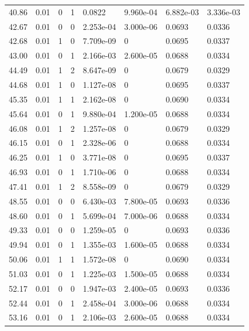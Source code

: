 \documentclass[preview]{standalone}
\begin{document}
{{{\begin{tabular}{L{1.2cm}C{1.2cm} C{0.3cm}C{0.5cm} C{1.4cm}C{1.4cm} C{1.4cm}C{1.4cm}}
  40.86  &  0.01  & 0     &  1 &  0.0822  & 9.960e-04  & 6.882e-03 &  3.336e-03   \\ 
  42.67  &  0.01  & 0     &  0 &  2.253e-04  & 3.000e-06  & 0.0693 &  0.0336   \\ 
  42.68  &  0.01  & 1     &  0 &  7.709e-09  & 0  & 0.0695 &  0.0337   \\ 
  43.00  &  0.01  & 0     &  1 &  2.166e-03  & 2.600e-05  & 0.0688 &  0.0334   \\ 
  44.49  &  0.01  & 1     &  2 &  8.647e-09  & 0  & 0.0679 &  0.0329   \\ 
  44.68  &  0.01  & 1     &  0 &  1.127e-08  & 0  & 0.0695 &  0.0337   \\ 
  45.35  &  0.01  & 1     &  1 &  2.162e-08  & 0  & 0.0690 &  0.0334   \\ 
  45.64  &  0.01  & 0     &  1 &  9.880e-04  & 1.200e-05  & 0.0688 &  0.0334   \\ 
  46.08  &  0.01  & 1     &  2 &  1.257e-08  & 0  & 0.0679 &  0.0329   \\ 
  46.15  &  0.01  & 0     &  1 &  2.328e-06  & 0  & 0.0688 &  0.0334   \\ 
  46.25  &  0.01  & 1     &  0 &  3.771e-08  & 0  & 0.0695 &  0.0337   \\ 
  46.93  &  0.01  & 0     &  1 &  1.710e-06  & 0  & 0.0688 &  0.0334   \\ 
  47.41  &  0.01  & 1     &  2 &  8.558e-09  & 0  & 0.0679 &  0.0329   \\ 
  48.55  &  0.01  & 0     &  0 &  6.430e-03  & 7.800e-05  & 0.0693 &  0.0336   \\ 
  48.60  &  0.01  & 0     &  1 &  5.699e-04  & 7.000e-06  & 0.0688 &  0.0334   \\ 
  49.33  &  0.01  & 0     &  0 &  1.259e-05  & 0  & 0.0693 &  0.0336   \\ 
  49.94  &  0.01  & 0     &  1 &  1.355e-03  & 1.600e-05  & 0.0688 &  0.0334   \\ 
  50.06  &  0.01  & 1     &  1 &  1.572e-08  & 0  & 0.0690 &  0.0334   \\ 
  51.03  &  0.01  & 0     &  1 &  1.225e-03  & 1.500e-05  & 0.0688 &  0.0334   \\ 
  52.17  &  0.01  & 0     &  0 &  1.947e-03  & 2.400e-05  & 0.0693 &  0.0336   \\ 
  52.44  &  0.01  & 0     &  1 &  2.458e-04  & 3.000e-06  & 0.0688 &  0.0334   \\ 
  53.16  &  0.01  & 0     &  1 &  2.106e-03  & 2.600e-05  & 0.0688 &  0.0334   \\ 

\end{tabular}}}}
\end{document}
